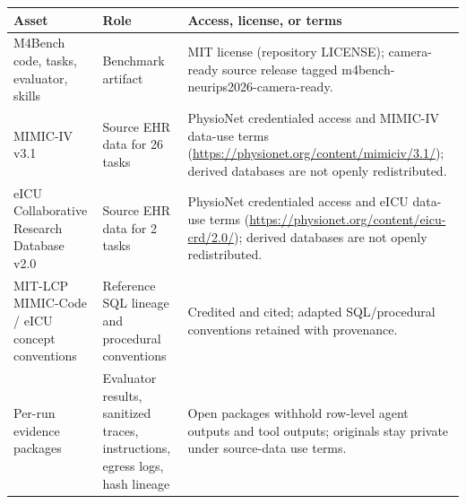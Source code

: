 \begin{tabular}{p{}p{}p{}}
\toprule
Asset & Role & Access, license, or terms \\
\midrule
M4Bench code, tasks, evaluator, skills & Benchmark artifact & MIT license (repository LICENSE); camera-ready source release tagged m4bench-neurips2026-camera-ready. \\
MIMIC-IV v3.1 & Source EHR data for 26 tasks & PhysioNet credentialed access and MIMIC-IV data-use terms (\url{https://physionet.org/content/mimiciv/3.1/}); derived databases are not openly redistributed. \\
eICU Collaborative Research Database v2.0 & Source EHR data for 2 tasks & PhysioNet credentialed access and eICU data-use terms (\url{https://physionet.org/content/eicu-crd/2.0/}); derived databases are not openly redistributed. \\
MIT-LCP MIMIC-Code / eICU concept conventions & Reference SQL lineage and procedural conventions & Credited and cited; adapted SQL/procedural conventions retained with provenance. \\
Per-run evidence packages & Evaluator results, sanitized traces, instructions, egress logs, hash lineage & Open packages withhold row-level agent outputs and tool outputs; originals stay private under source-data use terms. \\
\bottomrule
\end{tabular}
